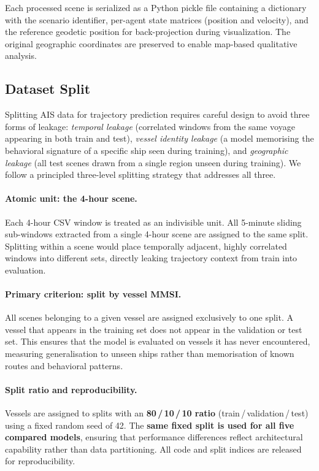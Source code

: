 \documentclass[12pt, a4paper]{article}
\begin{document}
  Each processed scene is serialized as a Python pickle file containing a dictionary with the scenario identifier, per-agent state matrices (position and velocity), and the reference geodetic position for
  back-projection during visualization. The original geographic coordinates are preserved to enable map-based qualitative analysis.

  \subsection{Dataset Split}

  Splitting AIS data for trajectory prediction requires careful design to avoid three
  forms of leakage: \emph{temporal leakage} (correlated windows from the same voyage
  appearing in both train and test), \emph{vessel identity leakage} (a model memorising
  the behavioral signature of a specific ship seen during training), and
  \emph{geographic leakage} (all test scenes drawn from a single region unseen during
  training).  We follow a principled three-level splitting strategy that addresses all
  three.

  \paragraph{Atomic unit: the 4-hour scene.}
  Each 4-hour CSV window is treated as an indivisible unit.  All 5-minute sliding
  sub-windows extracted from a single 4-hour scene are assigned to the same split.
  Splitting within a scene would place temporally adjacent, highly correlated windows
  into different sets, directly leaking trajectory context from train into evaluation.

  \paragraph{Primary criterion: split by vessel MMSI.}
  All scenes belonging to a given vessel are assigned exclusively to one split.
  A vessel that appears in the training set does not appear in the validation or test
  set.  This ensures that the model is evaluated on vessels it has never encountered,
  measuring generalisation to unseen ships rather than memorisation of known routes
  and behavioral patterns.

  \paragraph{Split ratio and reproducibility.}
  Vessels are assigned to splits with an \textbf{80\,/\,10\,/\,10 ratio}
  (train\,/\,validation\,/\,test) using a fixed random seed of 42.
  The \textbf{same fixed split is used for all five compared models}, ensuring that
  performance differences reflect architectural capability rather than data
  partitioning.  All code and split indices are released for reproducibility.
\end{document}
